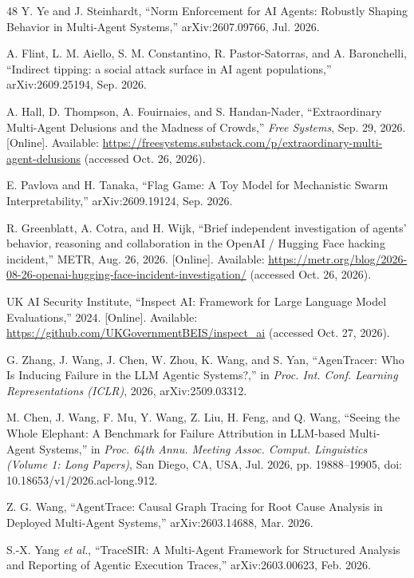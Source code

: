 \begin{thebibliography}{48}
 Y. Ye and J. Steinhardt, ``Norm Enforcement for AI Agents: Robustly Shaping Behavior in
Multi-Agent Systems,'' arXiv:2607.09766, Jul. 2026.

 A. Flint, L. M. Aiello, S. M. Constantino, R. Pastor-Satorras, and A. Baronchelli,
``Indirect tipping: a social attack surface in AI agent populations,'' arXiv:2609.25194, Sep. 2026.

 A. Hall, D. Thompson, A. Fouirnaies, and S. Handan-Nader, ``Extraordinary Multi-Agent
Delusions and the Madness of Crowds,'' \textit{Free Systems}, Sep. 29, 2026. [Online]. Available:
\url{https://freesystems.substack.com/p/extraordinary-multi-agent-delusions} (accessed Oct. 26, 2026).

 E. Pavlova and H. Tanaka, ``Flag Game: A Toy Model for Mechanistic Swarm
Interpretability,'' arXiv:2609.19124, Sep. 2026.

 R. Greenblatt, A. Cotra, and H. Wijk, ``Brief independent investigation of agents'
behavior, reasoning and collaboration in the OpenAI / Hugging Face hacking incident,'' METR, Aug. 26, 2026.
[Online]. Available: \url{https://metr.org/blog/2026-08-26-openai-hugging-face-incident-investigation/} (accessed
Oct. 26, 2026).

 UK AI Security Institute, ``Inspect AI: Framework for Large Language Model
Evaluations,'' 2024. [Online]. Available: \url{https://github.com/UKGovernmentBEIS/inspect_ai} (accessed Oct. 27,
2026).

 G. Zhang, J. Wang, J. Chen, W. Zhou, K. Wang, and S. Yan, ``AgenTracer: Who Is
Inducing Failure in the LLM Agentic Systems?,'' in \textit{Proc. Int. Conf. Learning Representations (ICLR)},
2026, arXiv:2509.03312.

 M. Chen, J. Wang, F. Mu, Y. Wang, Z. Liu, H. Feng, and Q. Wang, ``Seeing the Whole
Elephant: A Benchmark for Failure Attribution in LLM-based Multi-Agent Systems,'' in \textit{Proc. 64th Annu.
Meeting Assoc. Comput. Linguistics (Volume 1: Long Papers)}, San Diego, CA, USA, Jul. 2026, pp. 19888--19905,
doi: 10.18653/v1/2026.acl-long.912.

 Z. G. Wang, ``AgentTrace: Causal Graph Tracing for Root Cause Analysis in Deployed
Multi-Agent Systems,'' arXiv:2603.14688, Mar. 2026.

 S.-X. Yang \textit{et al.}, ``TraceSIR: A Multi-Agent Framework for Structured Analysis
and Reporting of Agentic Execution Traces,'' arXiv:2603.00623, Feb. 2026.


\end{thebibliography}
